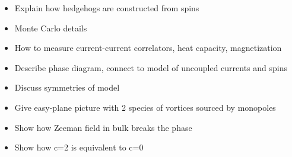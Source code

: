 \documentclass[prb,twocolumn]{revtex4}
\begin{document}
\begin{itemize}
\item Explain how hedgehogs are constructed from spins
\item Monte Carlo details
\item How to measure current-current correlators, heat capacity, magnetization
\item Describe phase diagram, connect to model of uncoupled currents and spins
\item Discuss symmetries of model
\item Give easy-plane picture with 2 species of vortices sourced by monopoles
\item Show how Zeeman field in bulk breaks the phase
\item Show how c=2 is equivalent to c=0
\end{itemize}
\end{document}
